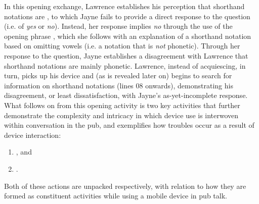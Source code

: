\begin{revisedsubmission}
In this opening exchange, Lawrence establishes his perception that shorthand notations are , to which Jayne fails to provide a direct response to the question (i.e. of \textit{yes} or \textit{no}).
Instead, her response implies \textit{no} through the use of the opening phrase , which she follows with an explanation of a shorthand notation based on omitting vowels (i.e. a notation that is \textit{not} phonetic).
Through her response to the question, Jayne establishes a disagreement with Lawrence that shorthand notations are mainly phonetic.
Lawrence, instead of acquiescing, in turn, picks up his device and (as is revealed later on) begins to search for information on shorthand notations (lines 08 onwards), demonstrating his disagreement, or least dissatisfaction, with Jayne's as-yet-incomplete response.
What follows on from this opening activity is two key activities that further demonstrate the complexity and intricacy in which device use is interwoven within conversation in the pub, and exemplifies how troubles occur as a result of device interaction:
\begin{enumerate}[label=(\roman*)]
    \item {}, and
    \item {}.
\end{enumerate}
Both of these actions are unpacked respectively, with relation to how they are formed as constituent activities while using a mobile device in pub talk.
\end{revisedsubmission}






